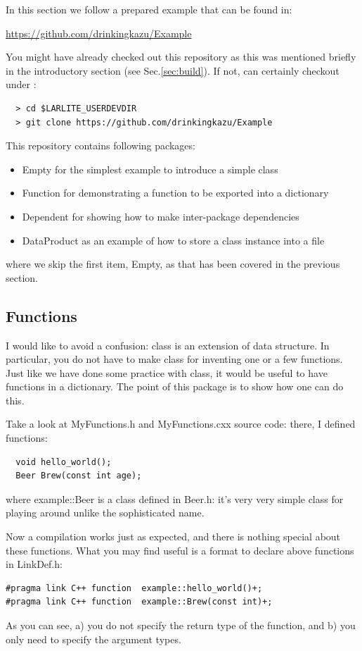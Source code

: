 
In this section we follow a prepared example that can be found in:
\begin{center}
{\color{blue}\url{https://github.com/drinkingkazu/Example}}
\end{center}
You might have already checked out this repository as this was mentioned briefly
in the introductory section (see Sec.\ref{sec:build}). 
If not, can certainly checkout under \UserDev:
\begin{lstlisting}
  > cd $LARLITE_USERDEVDIR
  > git clone https://github.com/drinkingkazu/Example
\end{lstlisting}

This repository contains following packages:
\begin{itemize}
\item {\ttfamily Empty} for the simplest example to introduce a simple \CPP class
\item {\ttfamily Function} for demonstrating a \CPP function to be exported into a dictionary
\item {\ttfamily Dependent} for showing how to make inter-package dependencies
\item {\ttfamily DataProduct} as an example of how to store a class instance into a file
\end{itemize}
where we skip the first item, {\ttfamily Empty}, as that has been covered in the previous section.

\subsection{\CPP Functions}
I would like to avoid a confusion: \CPP class is an extension of data structure. In particular,
you do not have to make \CPP class for inventing one or a few functions. Just like we have done
some practice with \CPP class, it would be useful to have \CPP functions in a dictionary.
The point of this package is to show how one can do this.

Take a look at {\ttfamily MyFunctions.h} and {\ttfamily MyFunctions.cxx} source code: there, I defined
functions:
\begin{lstlisting}
  void hello_world();
  Beer Brew(const int age);
\end{lstlisting}
where {\ttfamily example::Beer} is a \CPP class defined in {\ttfamily Beer.h}: it's very very simple class for
playing around unlike the sophisticated name.

Now a compilation works just as expected, and there is nothing special about these functions.
What you may find useful is a format to declare above functions in {\ttfamily LinkDef.h}:
\begin{lstlisting}
#pragma link C++ function  example::hello_world()+;
#pragma link C++ function  example::Brew(const int)+;
\end{lstlisting}
As you can see, a) you do not specify the return type of the function, and b) you only need to specify
the argument types. 

